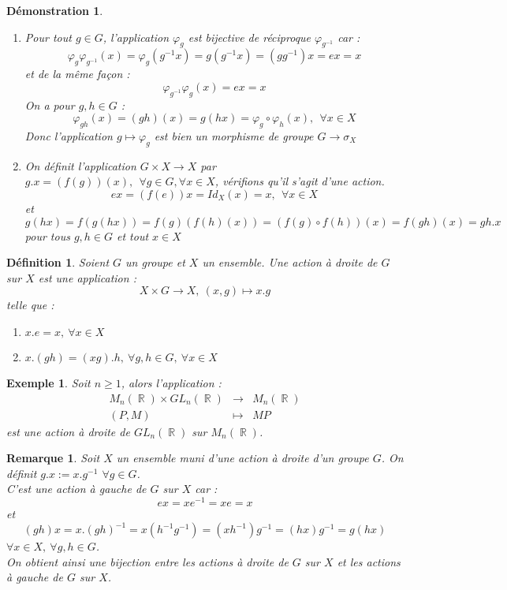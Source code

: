 \documentclass[a4paper, oneside]{report}
\theoremstyle{break}
\newtheorem{defi}[thm]{Définition}
\newtheorem{exem}[thm]{Exemple}
\newtheorem{remar}[thm]{Remarque}
\newtheorem*{demo}{Démonstration}
\newcommand{\x}{\times}
\DeclareMathOperator{\R}{\mathbb{R}}
\begin{document}
\begin{demo}
	\begin{enumerate}
		\item Pour tout $g\in G$, l'application $\varphi_g$ est bijective de réciproque $\varphi_{g^{-1}}$ car :
		$$\varphi_g\varphi_{g^{-1}}(x)=\varphi_g(g^{-1}x)=g(g^{-1}x)=(gg^{-1})x=ex=x$$
		et de la même façon :
		$$\varphi_{g^{-1}}\varphi_g(x)=ex=x$$
		On a pour $g,h\in G$ :
		$$\varphi_{gh}(x)=(gh)(x)=g(hx)=\varphi_g\circ \varphi_h(x),~~\forall x\in X$$
		Donc l'application $g\mapsto \varphi_g$ est bien un morphisme de groupe $G\rightarrow \sigma_X$
		\item On définit l'application $G\x X \rightarrow X$ par $g.x = (f(g))(x),~~\forall g\in G,\forall x\in X$, vérifions qu'il s'agit d'une action.\\
		$$ex=(f(e))x=Id_X(x)=x,~~\forall x\in X$$
		et 
		$$g(hx)=f(g(hx))=f(g)(f(h)(x))=(f(g)\circ f(h) )(x)=f(gh)(x)=gh.x$$
		pour tous $g,h\in G$ et tout $x\in X$
	\end{enumerate}
\end{demo}


\begin{defi}
	Soient $G$ un groupe et $X$ un ensemble. Une action à droite de $G$ sur $X$ est une application :
	$$X\x G\rightarrow X,~(x,g)\mapsto x.g$$
	telle que :
	\begin{enumerate}
		\item $x.e=x,~\forall x\in X$
		\item $x.(gh)=(xg).h,~\forall g,h\in G,~\forall x\in X$
	\end{enumerate}
\end{defi}

\begin{exem}
	Soit $n\geq 1$, alors l'application :
	$$\begin{array}{lll}
	M_n(\R)\x GL_n(\R)&\rightarrow & M_n(\R)\\
	(P,M)&\mapsto & MP
	\end{array}$$
	est une action à droite de $GL_n(\R)$ sur $M_n(\R)$.
\end{exem}

\begin{remar}
	Soit $X$ un ensemble muni d'une action à droite d'un groupe $G$. On définit $g.x := x.g^{-1}$ $\forall g\in G$.\\
	C'est une action à gauche de $G$ sur $X$ car :
	$$ex=xe^{-1}=xe=x$$
	et 
	$$(gh)x=x.(gh)^{-1}=x(h^{-1}g^{-1})=(xh^{-1})g^{-1}=(hx)g^{-1}=g(hx)$$
	$\forall x\in X, ~\forall g,h\in G$.\\
	On obtient ainsi une bijection entre les actions à droite de $G$ sur $X$ et les actions à gauche de $G$ sur $X$.
\end{remar}
\end{document}
